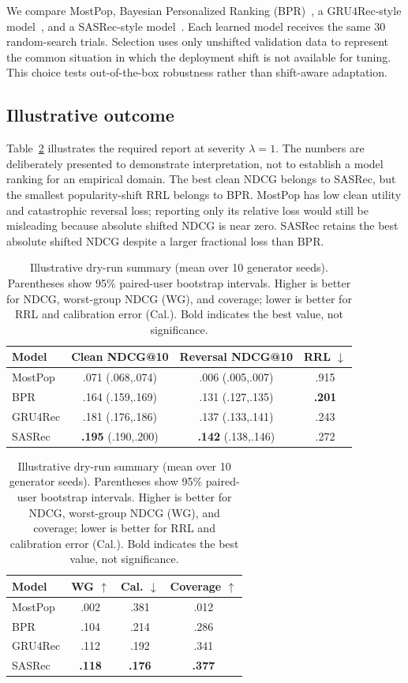 We compare MostPop, Bayesian Personalized Ranking (BPR)~\cite{Rendle2009}, a
GRU4Rec-style model~\cite{Hidasi2016}, and a SASRec-style model~\cite{Kang2018}.
Each learned model receives the same 30
random-search trials.  Selection uses only unshifted validation data to represent
the common situation in which the deployment shift is not available for tuning.
This choice tests out-of-the-box robustness rather than shift-aware adaptation.

\subsection{Illustrative outcome}

Table~\ref{tab:results} illustrates the required report at severity $\lambda=1$.
The numbers are deliberately presented to demonstrate interpretation, not to
establish a model ranking for an empirical domain.  The best clean NDCG belongs
to SASRec, but the smallest popularity-shift RRL belongs to BPR.  MostPop has low
clean utility and catastrophic reversal loss; reporting only its relative loss
would still be misleading because absolute shifted NDCG is near zero.  SASRec
retains the best absolute shifted NDCG despite a larger fractional loss than BPR.

\begin{table}[t]
  \caption{Illustrative dry-run summary (mean over 10 generator seeds).  Parentheses
  show 95\% paired-user bootstrap intervals.  Higher is better for NDCG,
  worst-group NDCG (WG), and coverage; lower is better for RRL and calibration
  error (Cal.).  Bold indicates the best value, not significance.}
  \label{tab:results}
  \centering
  \footnotesize
  \begin{tabular}{lccc}
    \toprule
    Model & Clean NDCG@10 & Reversal NDCG@10 & RRL $\downarrow$ \\
    \midrule
    MostPop & .071 (.068,.074) & .006 (.005,.007) & .915 \\
    BPR & .164 (.159,.169) & .131 (.127,.135) & \textbf{.201} \\
    GRU4Rec & .181 (.176,.186) & .137 (.133,.141) & .243 \\
    SASRec & \textbf{.195} (.190,.200) & \textbf{.142} (.138,.146) & .272 \\
    \bottomrule
  \end{tabular}
  \par\smallskip
  \begin{tabular}{lccc}
    \toprule
    Model & WG $\uparrow$ & Cal. $\downarrow$ & Coverage $\uparrow$ \\
    \midrule
    MostPop & .002 & .381 & .012 \\
    BPR & .104 & .214 & .286 \\
    GRU4Rec & .112 & .192 & .341 \\
    SASRec & \textbf{.118} & \textbf{.176} & \textbf{.377} \\
    \bottomrule
  \end{tabular}
\end{table}

